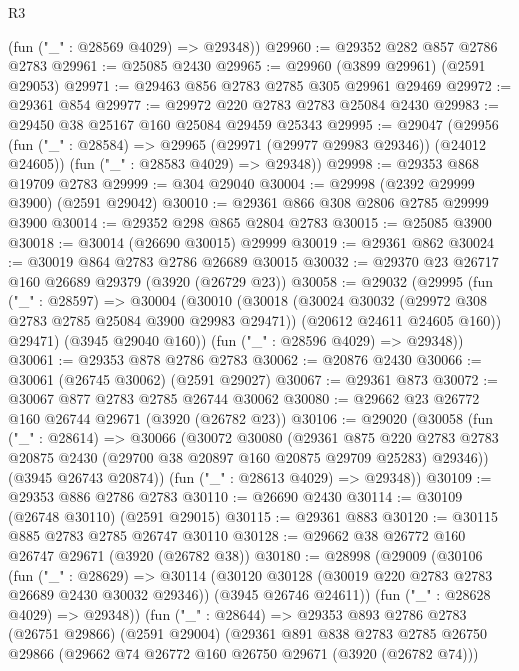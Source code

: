 \begin{lexlean}{R3}
\begin{coremodule}
      (fun ("_" : @28569 @4029) => @29348))
@29960 := @29352 @282 @857 @2786 @2783
@29961 := @25085 @2430
@29965 := @29960 (@3899 @29961) (@2591 @29053)
@29971 := @29463 @856 @2783 @2785 @305 @29961 @29469
@29972 := @29361 @854
@29977 := @29972 @220 @2783 @2783 @25084 @2430
@29983 := @29450 @38 @25167 @160 @25084 @29459 @25343
@29995 := @29047
    (@29956
      (fun ("_" : @28584) => @29965 (@29971 (@29977 @29983 @29346)) (@24012 @24605))
      (fun ("_" : @28583 @4029) => @29348))
@29998 := @29353 @868 @19709 @2783
@29999 := @304 @29040
@30004 := @29998 (@2392 @29999 @3900) (@2591 @29042)
@30010 := @29361 @866 @308 @2806 @2785 @29999 @3900
@30014 := @29352 @298 @865 @2804 @2783
@30015 := @25085 @3900
@30018 := @30014 (@26690 @30015) @29999
@30019 := @29361 @862
@30024 := @30019 @864 @2783 @2786 @26689 @30015
@30032 := @29370 @23 @26717 @160 @26689 @29379 (@3920 (@26729 @23))
@30058 := @29032
    (@29995
      (fun ("_" : @28597) =>
      @30004
        (@30010
          (@30018
            (@30024 @30032 (@29972 @308 @2783 @2785 @25084 @3900 @29983 @29471))
            (@20612 @24611 @24605 @160))
          @29471)
        (@3945 @29040 @160))
      (fun ("_" : @28596 @4029) => @29348))
@30061 := @29353 @878 @2786 @2783
@30062 := @20876 @2430
@30066 := @30061 (@26745 @30062) (@2591 @29027)
@30067 := @29361 @873
@30072 := @30067 @877 @2783 @2785 @26744 @30062
@30080 := @29662 @23 @26772 @160 @26744 @29671 (@3920 (@26782 @23))
@30106 := @29020
    (@30058
      (fun ("_" : @28614) =>
      @30066
        (@30072
          @30080
          (@29361
            @875
            @220
            @2783
            @2783
            @20875
            @2430
            (@29700 @38 @20897 @160 @20875 @29709 @25283)
            @29346))
        (@3945 @26743 @20874))
      (fun ("_" : @28613 @4029) => @29348))
@30109 := @29353 @886 @2786 @2783
@30110 := @26690 @2430
@30114 := @30109 (@26748 @30110) (@2591 @29015)
@30115 := @29361 @883
@30120 := @30115 @885 @2783 @2785 @26747 @30110
@30128 := @29662 @38 @26772 @160 @26747 @29671 (@3920 (@26782 @38))
@30180 := @28998
    (@29009
      (@30106
        (fun ("_" : @28629) =>
        @30114
          (@30120 @30128 (@30019 @220 @2783 @2783 @26689 @2430 @30032 @29346))
          (@3945 @26746 @24611))
        (fun ("_" : @28628 @4029) => @29348))
      (fun ("_" : @28644) =>
      @29353
        @893
        @2786
        @2783
        (@26751 @29866)
        (@2591 @29004)
        (@29361
          @891
          @838
          @2783
          @2785
          @26750
          @29866
          (@29662 @74 @26772 @160 @26750 @29671 (@3920 (@26782 @74)))

\end{coremodule}
\end{lexlean}
